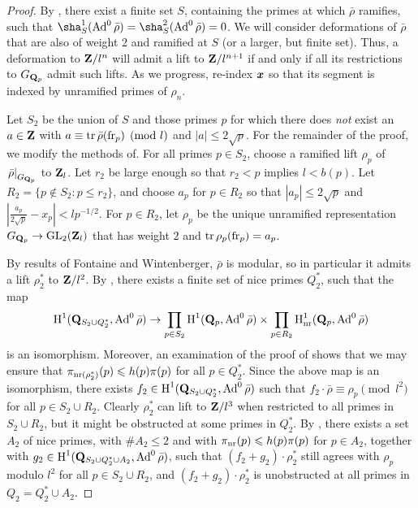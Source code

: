 \begin{proof}
By \cite[Lem.~6]{khare-larsen-ramakrishna-2005}, there exist a finite set 
$S$, containing the primes at which $\bar\rho$ ramifies, such that 
$\sha_S^1(\Ad^0\bar\rho) = \sha_S^2(\Ad^0\bar\rho) = 0$. We will 
consider deformations of $\bar\rho$ that are also of weight $2$ and ramified at 
$S$ (or a larger, but finite set). Thus, a deformation to $\mathbf{Z}/l^n$ will 
admit a lift to $\mathbf{Z}/l^{n+1}$ if and only if all its restrictions to 
$G_{\mathbf{Q}_p}$ admit such lifts. As we progress, re-index ${\boldsymbol x}$ so that its 
segment is indexed by unramified primes of $\rho_n$. 

Let $S_2$ be the union of $S$ and those primes $p$ for which there does 
\emph{not} exist an $a\in \mathbf{Z}$ with $a\equiv \operatorname{tr}\bar\rho(\mathrm{fr}_p)\pmod{l}$ and 
$|a|\leqslant 2\sqrt p$. For the remainder of the proof, we modify the methods 
of\cite{khare-larsen-ramakrishna-2005,pande-2011}. For all primes $p\in S_2$, 
choose a ramified lift $\rho_p$ of $\left.\bar\rho\right|_{G_{\mathbf{Q}_p}}$ to 
$\mathbf{Z}_l$. Let $r_2$ be large enough so that $r_2 < p$ implies $l < b(p)$. Let 
$R_2 = \{p\notin S_2 : p \leqslant r_2\}$, and choose $a_p$ for $p\in R_2$ so 
that $|a_p| \leqslant 2\sqrt p$ and 
$\left|\frac{a_p}{2\sqrt p} - x_p\right| < l p^{-1/2}$. For $p\in R_2$, let 
$\rho_p$ be the unique unramified representation $G_{\mathbf{Q}_p} \to \operatorname{GL}_2(\mathbf{Z}_l)$ 
that has weight $2$ and $\operatorname{tr}\rho_p(\mathrm{fr}_p) = a_p$. 

By results of Fontaine and Wintenberger, $\bar\rho$ is modular, so in particular 
it admits a lift $\rho_2^\ast$ to $\mathbf{Z}/l^2$. By 
\cite[Lem.~8]{khare-larsen-ramakrishna-2005}, there exists a finite set of 
nice primes $Q_2^\ast$, such that the map 
\[
	\operatorname{H}^1(\mathbf{Q}_{S_2\cup Q_2^\ast},\operatorname{Ad}^0\bar\rho) \to \prod_{p\in S_2} \operatorname{H}^1(\mathbf{Q}_p,\operatorname{Ad}^0\bar\rho) \times \prod_{p\in R_2} \operatorname{H}_{\mathrm{nr}}^1(\mathbf{Q}_p,\operatorname{Ad}^0\bar\rho) 
\]
is an isomorphism. Moreover, an examination of the proof of 
\cite[Fact 5]{khare-larsen-ramakrishna-2005} shows that we may ensure that 
$\pi_{\mathrm{nr}(\rho_2^\ast)}(p) \leqslant h(p) \pi(p)$ for all $p\in Q_2^\ast$. 
Since the above map is an isomorphism, there exists 
$f_2\in \operatorname{H}^1(\mathbf{Q}_{S_2\cup Q_2^\ast},\operatorname{Ad}^0\bar\rho)$ such that 
$f_2\cdot\bar\rho\equiv \rho_p\pmod{l^2}$ for all $p\in S_2\cup R_2$. Clearly 
$\rho_2^\ast$ can lift to $\mathbf{Z}/l^3$ when restricted to all primes in 
$S_2\cup R_2$, but it might be obstructed at some primes in $Q_2^\ast$. By 
\cite[Prop.~3.10]{pande-2011}, there exists a set $A_2$ of nice primes, with 
$\# A_2\leqslant 2$ and with $\pi_{\mathrm{nr}}(p) \leqslant h(p) \pi(p)$ for 
$p\in A_2$, together with 
$g_2\in \operatorname{H}^1(\mathbf{Q}_{S_2\cup Q_2^\ast \cup A_2},\operatorname{Ad}^0\bar\rho)$, such that 
$(f_2+g_2)\cdot\rho_2^\ast$ still agrees with $\rho_p$ modulo $l^2$ for all 
$p\in S_2\cup R_2$, and $(f_2+g_2)\cdot\rho_2^\ast$ is unobstructed at all 
primes in $Q_2 = Q_2^\ast\cup A_2$. 


\end{proof}
